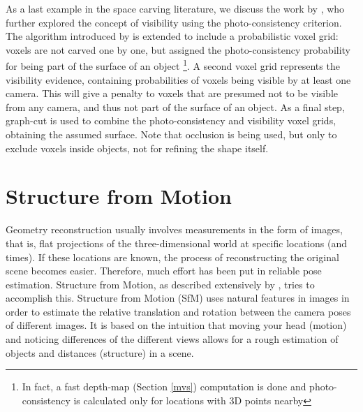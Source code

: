 As a last example in the space carving literature, we discuss the work by , who further explored the concept of visibility using the photo-consistency criterion. The algorithm introduced by \SeitzOld is extended to include a probabilistic voxel grid: voxels are not carved one by one, but assigned the photo-consistency probability for being part of the surface of an object \footnote{In fact, a fast depth-map (Section \ref{mvs}) computation is done and photo-consistency is calculated only for locations with 3D points nearby}. A second voxel grid represents the visibility evidence, containing probabilities of voxels being visible by at least one camera. This will give a penalty to voxels that are presumed not to be visible from any camera, and thus not part of the surface of an object. As a final step, graph-cut is used to combine the photo-consistency and visibility voxel grids, obtaining the assumed surface. Note that occlusion is being used, but only to exclude voxels inside objects, not for refining the shape itself.


\section{Structure from Motion}  \label{sfm}
Geometry reconstruction usually involves measurements in the form of images, that is, flat projections of the three-dimensional world at specific locations (and times). If these locations are known, the process of reconstructing the original scene becomes easier. Therefore, much effort has been put in reliable pose estimation. Structure from Motion, as described extensively by , tries to accomplish this. Structure from Motion (SfM) uses natural features in images in order to estimate the relative translation and rotation between the camera poses of different images. It is based on the intuition that moving your head (motion) and noticing differences of the different views allows for a rough estimation of objects and distances (structure) in a scene.

